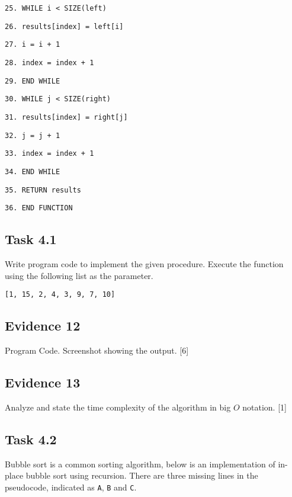 {\begin{minipage}[t]{1\columnwidth - 2\fboxsep - 2\fboxrule}
\texttt{25. \qquad{}WHILE i < SIZE(left)}

\texttt{26. \qquad{}\qquad{}results{[}index{]} = left{[}i{]} }

\texttt{27. \qquad{}\qquad{}i = i + 1}

\texttt{28. \qquad{}\qquad{}index = index + 1 }

\texttt{29. \qquad{}END WHILE}

\texttt{30. \qquad{}WHILE j < SIZE(right) }

\texttt{31. \qquad{}\qquad{}results{[}index{]} = right{[}j{]} }

\texttt{32. \qquad{}\qquad{}j = j + 1 }

\texttt{33. \qquad{}\qquad{}index = index + 1 }

\texttt{34. \qquad{}END WHILE}

\texttt{35. \qquad{}RETURN results}

\texttt{36. END FUNCTION }%
\end{minipage}}

\subsection*{Task 4.1 }

Write program code to implement the given procedure. Execute the function
using the following list as the parameter. 

\texttt{{[}1, 15, 2, 4, 3, 9, 7, 10{]}} 

\subsection*{Evidence 12 }

Program Code. Screenshot showing the output. \hfill{}{[}6{]}

\subsection*{Evidence 13}

Analyze and state the time complexity of the algorithm in big $O$
notation.\hfill{} {[}1{]}

\subsection*{Task 4.2 }

Bubble sort is a common sorting algorithm, below is an implementation
of in-place bubble sort using recursion. There are three missing lines
in the pseudocode, indicated as \texttt{A}, \texttt{B} and \texttt{C}. 

